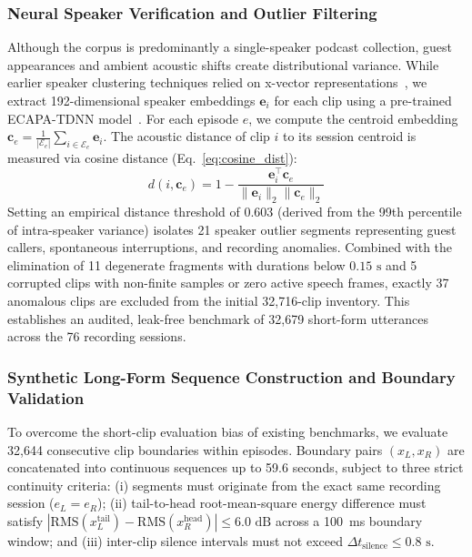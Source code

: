 \documentclass[journal]{IEEEtran}
\begin{document}
\subsubsection{Neural Speaker Verification and Outlier Filtering}
Although the corpus is predominantly a single-speaker podcast collection, guest appearances and ambient acoustic shifts create distributional variance. While earlier speaker clustering techniques relied on x-vector representations~\cite{snyder2018xvectors}, we extract 192-dimensional speaker embeddings $\mathbf{e}_i$ for each clip using a pre-trained ECAPA-TDNN model~\cite{desplanques2020ecapa}. For each episode $e$, we compute the centroid embedding $\mathbf{c}_e = \frac{1}{|\mathcal{E}_e|} \sum_{i \in \mathcal{E}_e} \mathbf{e}_i$. The acoustic distance of clip $i$ to its session centroid is measured via cosine distance (Eq.~\ref{eq:cosine_dist}):
\begin{equation}
d(i, \mathbf{c}_e) = 1 - \frac{\mathbf{e}_i^\top \mathbf{c}_e}{\|\mathbf{e}_i\|_2 \|\mathbf{c}_e\|_2}
\label{eq:cosine_dist}
\end{equation}
Setting an empirical distance threshold of $0.603$ (derived from the 99th percentile of intra-speaker variance) isolates 21 speaker outlier segments representing guest callers, spontaneous interruptions, and recording anomalies. Combined with the elimination of 11 degenerate fragments with durations below $0.15\text{ s}$ and 5 corrupted clips with non-finite samples or zero active speech frames, exactly 37 anomalous clips are excluded from the initial 32,716-clip inventory. This establishes an audited, leak-free benchmark of 32,679 short-form utterances across the 76 recording sessions.

\subsubsection{Synthetic Long-Form Sequence Construction and Boundary Validation}
To overcome the short-clip evaluation bias of existing benchmarks, we evaluate 32,644 consecutive clip boundaries within episodes. Boundary pairs $(x_L, x_R)$ are concatenated into continuous sequences up to 59.6 seconds, subject to three strict continuity criteria: (i) segments must originate from the exact same recording session ($e_L = e_R$); (ii) tail-to-head root-mean-square energy difference must satisfy $|\text{RMS}(x_L^{\text{tail}}) - \text{RMS}(x_R^{\text{head}})| \le 6.0\text{ dB}$ across a 100~ms boundary window; and (iii) inter-clip silence intervals must not exceed $\Delta t_{\text{silence}} \le 0.8\text{ s}$. 
\end{document}
